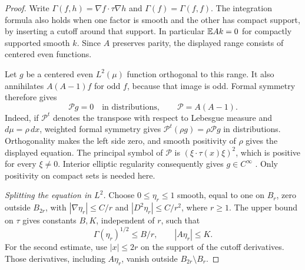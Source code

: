 \begin{proof}
Write $\Gamma(f,h)=\nabla f\cdot\tau\nabla h$ and
$\Gamma(f)=\Gamma(f,f)$.  The integration formula also holds when one
factor is smooth and the other has compact support, by inserting a
cutoff around that support.  In particular $\mathbb E Ak=0$ for compactly
supported smooth $k$.  Since $A$ preserves parity, the displayed range
consists of centered even functions.

Let $g$ be a centered even $L^2(\mu)$ function orthogonal to this range.
It also annihilates $A(A-1)f$ for odd $f$, because that image is odd.
Formal symmetry therefore gives
\[
 \mathcal P g=0\quad\text{in distributions},\qquad \mathcal P=A(A-1).
\]
Indeed, if $\mathcal P^t$ denotes the transpose with respect to
Lebesgue measure and $d\mu=\rho\,dx$, weighted formal symmetry gives
$\mathcal P^t(\rho g)=\rho\mathcal P g$ in distributions.
Orthogonality makes the left side zero, and smooth positivity of
$\rho$ gives the displayed equation.  The principal symbol of $\mathcal P$ is
$(\xi\cdot\tau(x)\xi)^2$, which is positive for every $\xi\ne0$.
Interior elliptic regularity consequently gives $g\in C^\infty$
\cite[Theorem~14.2]{Dyatlov2026}.  Only positivity on compact sets is
needed here.

\smallskip
\noindent\emph{Splitting the equation in $L^2$.}
Choose $0\le\eta_r\le1$ smooth, equal to one on $B_r$, zero outside
$B_{2r}$, with $|\nabla\eta_r|\le C/r$ and $|D^2\eta_r|\le C/r^2$,
where $r\ge1$.  The upper bound on $\tau$ gives constants $B,K$,
independent of $r$, such that
\begin{equation}\label{eq:density-cutoff}
 \Gamma(\eta_r)^{1/2}\le B/r,
 \qquad |A\eta_r|\le K.
\end{equation}
For the second estimate, use $|x|\le2r$ on the support of the cutoff
derivatives.  Those derivatives, including $A\eta_r$, vanish outside
$B_{2r}\setminus B_r$.


\end{proof}
